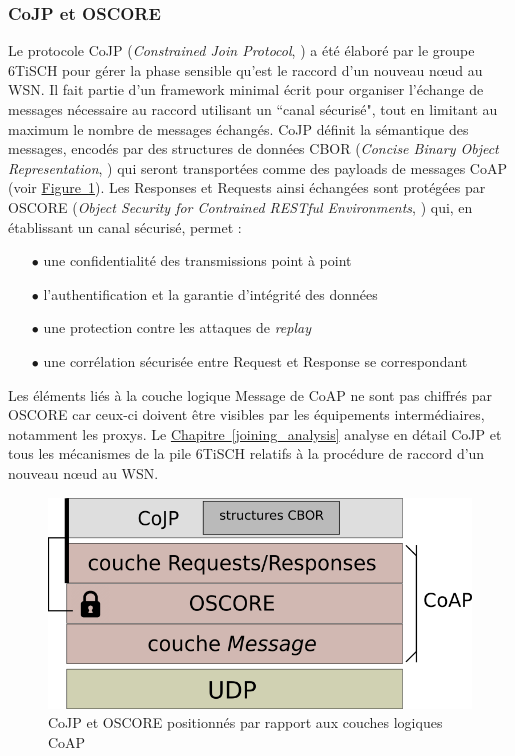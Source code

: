 \documentclass[]{report}
\newcommand{\wordlink}[2]{\hyperref[#2]{#1~\ref{#2}}}
\begin{document}
\subsubsection{CoJP et OSCORE}
\label{intro_CoJP}

\par Le protocole CoJP (\textit{Constrained Join Protocol}, \cite{ietf-6tisch-minimal-security-15}) a été élaboré par le groupe 6TiSCH pour gérer la phase sensible qu'est le raccord d'un nouveau nœud au WSN. Il fait partie d'un framework minimal \cite{ietf-6tisch-minimal-security-15} écrit pour organiser l'échange de messages nécessaire au raccord utilisant un ``canal sécurisé", tout en limitant au maximum le nombre de messages échangés. CoJP définit la sémantique des messages, encodés par des structures de données CBOR (\textit{Concise Binary Object Representation}, \cite{rfc7049}) qui seront transportées comme des payloads de messages CoAP (voir \wordlink{Figure}{fig:CoJP_stack}). Les Responses et Requests ainsi échangées sont protégées par OSCORE (\textit{Object Security for Contrained RESTful Environments}, \cite{rfc8613}) qui, en établissant un canal sécurisé, permet :
\vspace{0.1cm}
\begin{itemize}
\item[$\bullet$] une confidentialité des transmissions point à point
\item[$\bullet$] l'authentification et la garantie d'intégrité des données
\item[$\bullet$] une protection contre les attaques de \textit{replay}
\item[$\bullet$] une corrélation sécurisée entre Request et Response se correspondant
\end{itemize}

\vspace{0.2cm}

\par Les éléments liés à la couche logique Message de CoAP ne sont pas chiffrés par OSCORE car ceux-ci doivent être visibles par les équipements intermédiaires, notamment les proxys. Le \wordlink{Chapitre}{joining_analysis} analyse en détail CoJP et tous les mécanismes de la pile 6TiSCH relatifs à la procédure de raccord d'un nouveau nœud au WSN.  

\vspace{0.02cm}

	\begin{figure}[!hb]
	\centering
	\includegraphics[width=0.45\linewidth]{CoJP_stack}
	\caption{CoJP et OSCORE positionnés par rapport aux couches logiques CoAP}
	\label{fig:CoJP_stack}
	\end{figure}
\end{document}
